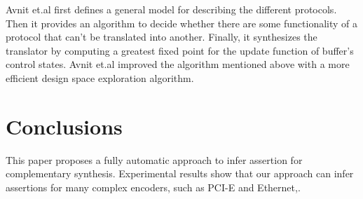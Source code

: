 \documentclass{sig-alternate}
\begin{document}
Avnit et.al \cite{converter_date08} first defines a general model for describing the different protocols.
Then it provides an algorithm to decide
whether there are some functionality of a protocol that can't be translated into another.
Finally,
it synthesizes the translator by computing a greatest fixed point for the update function of buffer's control states.
Avnit et.al\cite{converter_date09} improved the algorithm mentioned above with a more efficient design space exploration algorithm.

\section{Conclusions}\label{sec_conclude}

This paper proposes a fully automatic approach to infer assertion for complementary synthesis.
Experimental results show that our approach can infer assertions for many complex encoders,
such as PCI-E\cite{PCIESPEC} and Ethernet\cite{IEEE80232002},.





%

%
%
\end{document}
